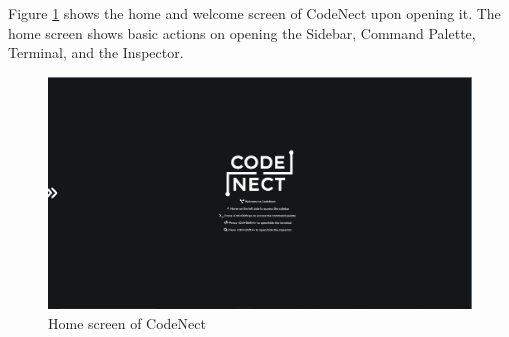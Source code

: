 \parx
Figure \ref{fig:cn_home} shows the home and welcome screen of CodeNect upon opening it.
The home screen shows basic actions on opening the Sidebar, Command Palette, Terminal,
and the Inspector.

\begin{figure}[H]
	\centering
	\captionsetup{justification=centering}
	\captionsetup[figure]{list=yes}
	\includegraphics[width=\linewidth]{media/sc_home.png}
	\caption[Home Screen of CodeNect]{Home screen of CodeNect}
	\label{fig:cn_home}
\end{figure}
